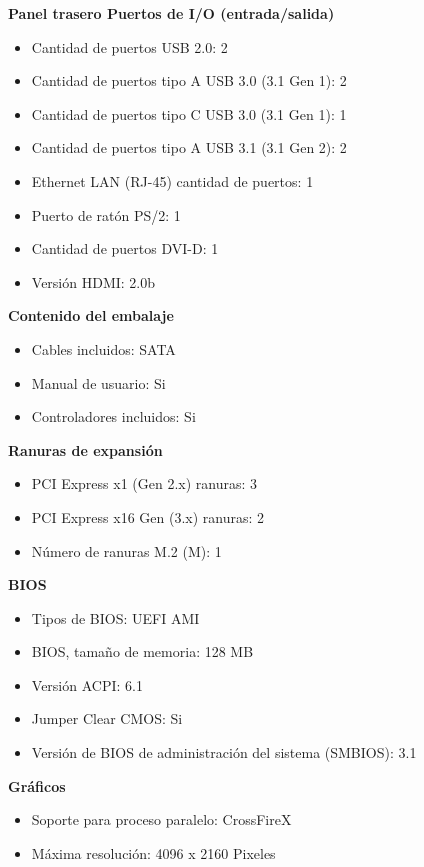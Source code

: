 \documentclass{article}
\begin{document}
    \textbf{ Panel trasero Puertos de I/O (entrada/salida)}
    \begin{itemize}
      \item Cantidad de puertos USB 2.0: 2
      \item Cantidad de puertos tipo A USB 3.0 (3.1 Gen 1): 2
      \item Cantidad de puertos tipo C USB 3.0 (3.1 Gen 1): 1
      \item Cantidad de puertos tipo A USB 3.1 (3.1 Gen 2): 2
      \item Ethernet LAN (RJ-45) cantidad de puertos: 1
      \item Puerto de ratón PS/2: 1
      \item Cantidad de puertos DVI-D: 1
      \item Versión HDMI: 2.0b
    \end{itemize}

    \textbf{Contenido del embalaje}
    \begin{itemize}
      \item Cables incluidos: SATA
      \item Manual de usuario: Si
      \item Controladores incluidos: Si
    \end{itemize}

    \textbf{Ranuras de expansión}
    \begin{itemize}
      \item PCI Express x1 (Gen 2.x) ranuras: 3
      \item PCI Express x16 Gen (3.x) ranuras: 2
      \item Número de ranuras M.2 (M): 1
    \end{itemize}

    \textbf{ BIOS}
    \begin{itemize}
      \item    Tipos de BIOS: UEFI AMI
      \item BIOS, tamaño de memoria: 128 MB
      \item Versión ACPI: 6.1
      \item Jumper Clear CMOS: Si
      \item Versión de BIOS de administración del sistema (SMBIOS): 3.1
    \end{itemize}

    \textbf{ Gráficos}
    \begin{itemize}
      \item Soporte para proceso paralelo: CrossFireX
      \item Máxima resolución: 4096 x 2160 Pixeles
    \end{itemize}
\end{document}
